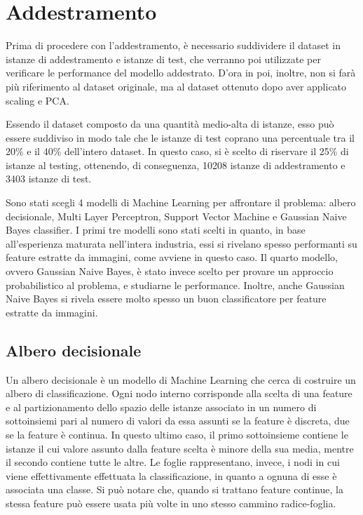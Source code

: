 \section{Addestramento}
Prima di procedere con l'addestramento, è necessario suddividere il dataset in
istanze di addestramento e istanze di test, che verranno poi utilizzate per verificare
le performance del modello addestrato. D'ora in poi, inoltre, non si farà più
riferimento al dataset originale, ma al dataset ottenuto dopo aver
applicato scaling e PCA.

Essendo il dataset composto da una quantità medio-alta di istanze,
esso può essere suddiviso in
modo tale che le istanze di test coprano una percentuale tra il 20\% e 
il 40\% dell'intero dataset.
In questo caso, si è scelto di riservare il 25\% di istanze al testing,
ottenendo, di conseguenza, 10208 istanze di addestramento e 3403 istanze di test.

Sono stati scegli 4 modelli di Machine Learning per affrontare il problema:
albero decisionale, Multi Layer Perceptron, Support Vector Machine e
Gaussian Naive Bayes classifier.
I primi tre modelli sono stati scelti in quanto, in base all'esperienza
maturata nell'intera
industria, essi si rivelano spesso performanti su feature estratte da immagini,
come avviene in questo caso.
Il quarto modello, ovvero Gaussian Naive Bayes, è stato invece scelto per provare
un approccio probabilistico al problema, e studiarne le performance. Inoltre,
anche Gaussian Naive Bayes si rivela essere molto spesso un buon classificatore
per feature estratte da immagini.

\subsection{Albero decisionale}
Un albero decisionale è un modello di Machine Learning che cerca di 
costruire un albero di classificazione. Ogni nodo interno corrisponde alla scelta
di una feature e al partizionamento dello spazio delle istanze associato in un 
numero di sottoinsiemi pari al numero di valori da essa assunti se la feature
è discreta, due se la feature è continua.
In questo ultimo caso, il primo sottoinsieme contiene le istanze il cui valore 
assunto dalla feature scelta è minore della sua media, mentre il secondo contiene
tutte le altre.
Le foglie rappresentano, invece, i nodi in cui viene effettivamente
effettuata la classificazione, in quanto a ognuna di esse è associata una classe.
Si può notare che, quando si trattano feature continue, la stessa feature può
essere usata più volte in uno stesso cammino radice-foglia.

